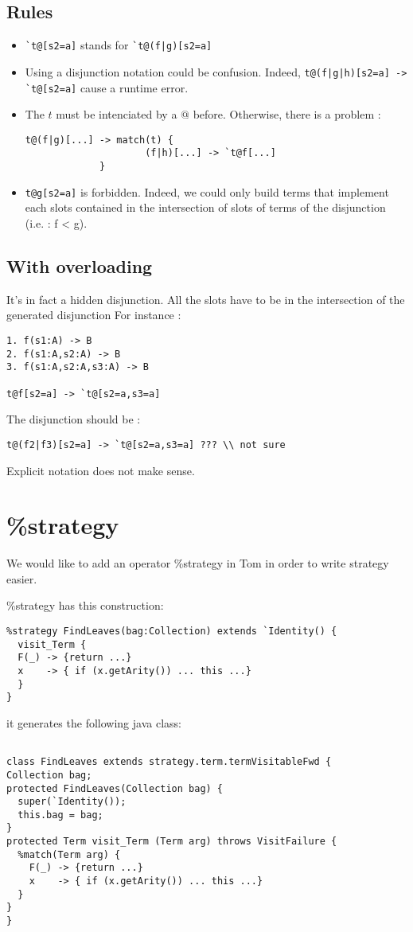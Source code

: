\documentclass{article}
\begin{document}
\subsection{Rules}
\begin{itemize}
\item \verb$`t@[s2=a]$ stands for \verb$`t@(f|g)[s2=a]$
\item Using a disjunction notation could be confusion. Indeed, \verb$t@(f|g|h)[s2=a] -> `t@[s2=a]$ cause a runtime error.
\item The $t$ must be intenciated by a $@$ before. Otherwise, there is a problem :
\begin{verbatim}
t@(f|g)[...] -> match(t) {
                     (f|h)[...] -> `t@f[...]
             }
\end{verbatim}
\item \verb$t@g[s2=a]$ is forbidden. Indeed, we could only build terms that implement each slots contained in the intersection of slots of terms of the disjunction (i.e. : f < g).
\end{itemize}
\subsection{With overloading}
It's in fact a hidden disjunction. All the slots have to be in the intersection of the generated disjunction For instance :
\begin{verbatim}
1. f(s1:A) -> B
2. f(s1:A,s2:A) -> B
3. f(s1:A,s2:A,s3:A) -> B

t@f[s2=a] -> `t@[s2=a,s3=a]
\end{verbatim}
The disjunction should be :
\begin{verbatim}
t@(f2|f3)[s2=a] -> `t@[s2=a,s3=a] ??? \\ not sure
\end{verbatim}
Explicit notation does not make sense.

\section{\%strategy}

We would like to add an operator \%strategy in Tom in order to write strategy easier.

\%strategy has this construction:
\begin{verbatim}
%strategy FindLeaves(bag:Collection) extends `Identity() {
  visit_Term {
  F(_) -> {return ...}
  x    -> { if (x.getArity()) ... this ...}
  }
}
\end{verbatim}
it generates the following java class:
\begin{verbatim}

class FindLeaves extends strategy.term.termVisitableFwd {
Collection bag;
protected FindLeaves(Collection bag) {
  super(`Identity());
  this.bag = bag;
}
protected Term visit_Term (Term arg) throws VisitFailure {
  %match(Term arg) {
    F(_) -> {return ...}
    x    -> { if (x.getArity()) ... this ...}
  }
}
}
\end{verbatim}
\end{document}
